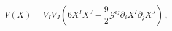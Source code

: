 \begin{equation}
V(X) = V_I V_J \left(6X^I X^J - \frac 92 \mathcal{G}^{ij}\partial_i
X^I \partial_j X^J \right)\,,  \label{scalarpot1}
\end{equation}

